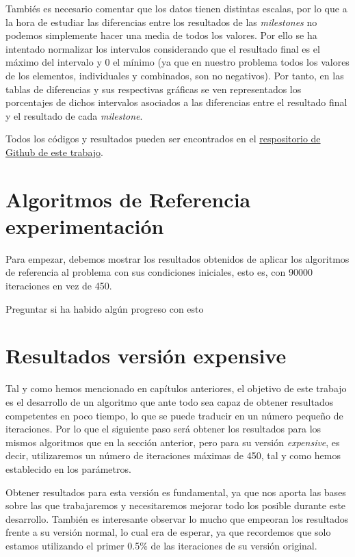 Tambiés es necesario comentar que los datos tienen distintas escalas, por lo que a la hora de estudiar las diferencias entre los resultados de las \textit{milestones} no podemos simplemente hacer una media de todos los valores. 
Por ello se ha intentado normalizar los intervalos considerando que el resultado final es el máximo del intervalo y 0 el mínimo (ya que en nuestro problema todos los valores de los elementos, individuales y combinados, son no negativos). 
Por tanto, en las tablas de diferencias y sus respectivas gráficas se ven representados los porcentajes de dichos intervalos asociados a las diferencias entre el resultado final y el resultado de cada \textit{milestone}.

Todos los códigos y resultados pueden ser encontrados en el \href{https://github.com/Itrilor/TFG/tree/main}{respositorio de Github de este trabajo}. 

\section{Algoritmos de Referencia experimentación}

\color{red}

Para empezar, debemos mostrar los resultados obtenidos de aplicar los algoritmos de referencia al problema con sus condiciones iniciales, esto es, con 90000 iteraciones en vez de 450. 


Preguntar si ha habido algún progreso con esto

\color{black}

\section{Resultados versión expensive}

Tal y como hemos mencionado en capítulos anteriores, el objetivo de este trabajo es el desarrollo de un algoritmo que ante todo sea capaz de obtener resultados competentes en poco tiempo, lo que se puede traducir en un número pequeño de iteraciones. 
Por lo que el siguiente paso será obtener los resultados para los mismos algoritmos que en la sección anterior, pero para su versión \textit{expensive}, es decir, utilizaremos un número de iteraciones máximas de 450, tal y como hemos establecido en los parámetros. 

Obtener resultados para esta versión es fundamental, ya que nos aporta las bases sobre las que trabajaremos y necesitaremos mejorar todo los posible durante este desarrollo. 
También es interesante observar lo mucho que empeoran los resultados frente a su versión normal, lo cual era de esperar, ya que recordemos que solo estamos utilizando el primer 0.5\% de las iteraciones de su versión original. 

